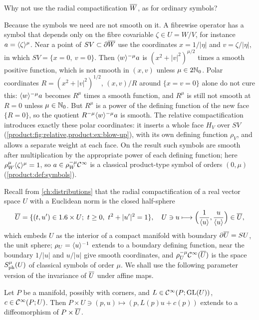 \begin{question}
  Why not use the radial compactification $\overline{W}$, as for ordinary symbols?
\end{question}
\begin{answer}
  Because the symbols we need are not smooth on it. A fibrewise operator has a
  symbol that depends only on the fibre covariable $\zeta\in U=W/V$, for instance
  $a=\langle \zeta\rangle^\mu$. Near a point of $SV\subset\partial\overline{W}$ use the coordinates
  $x=1/|\eta|$ and $v=\zeta/|\eta|$, in which $SV=\{x=0,\ v=0\}$. Then
  $\langle w\rangle^{-\mu}a$ is $(x^2+|v|^2)^{\mu/2}$ times a smooth positive function, which
  is not smooth in $(x,v)$ unless $\mu\in2\mathbb{N}_0$. Polar coordinates
  $R=(x^2+|v|^2)^{1/2}$, $(x,v)/R$ around $\{x=v=0\}$ alone do not cure this:
  $\langle w\rangle^{-\mu}a$ becomes $R^\mu$ times a smooth function, and $R^\mu$ is still not
  smooth at $R=0$ unless $\mu\in\mathbb{N}_0$. But $R^\mu$ is a power of the defining
  function of the new face $\{R=0\}$, so the quotient $R^{-\mu}\langle w\rangle^{-\mu}a$ is
  smooth. The relative compactification introduces exactly these polar
  coordinates: it inserts a whole face $H_V$ over $SV$
  (\cref{product:fig:relative,product:ex:blow-up}), with its own defining function
  $\rho_V$, and allows a separate weight at each face. On the result such symbols
  are smooth after multiplication by the appropriate power of each defining
  function; here $\rho_W^\mu\langle \zeta\rangle^\mu=1$, so $a\in\rho_W^{-\mu}\mathcal{C}^\infty$ is a
  classical product-type symbol of orders $(0,\mu)$
  (\cref{product:def:symbols}).
\end{answer}

Recall from \cref{ch:distributions} that the radial compactification of a real
vector space $U$ with a Euclidean norm is the closed half-sphere
\begin{equation*}
\RC U=\{(t,u')\in\R\times U;\ t\ge0,\ t^2+|u'|^2=1\},\quad
U\ni u\longmapsto\Big(\frac1{\ang u},\frac u{\ang u}\Big)\in\RC U,
\end{equation*}
which embeds $U$ as the interior of a compact manifold with boundary
$\partial\overline{U}=SU$, the unit sphere; $\rho_U=\langle u\rangle^{-1}$ extends to a boundary defining
function, near the boundary $1/|u|$ and $u/|u|$ give smooth coordinates, and
$\rho_U^{-\mu}\mathcal{C}^\infty(\overline{U})$ is the space $S^{\mu}_{\mathrm{ph}}(U)$ of classical symbols of
order $\mu$. We shall use the following parameter version of the invariance of
$\overline{U}$ under affine maps.

\begin{lemma}\label{product:lem:affine}
Let $P$ be a manifold, possibly with corners, and $L\in\mathcal{C}^\infty(P;\operatorname{GL}(U))$,
$c\in\mathcal{C}^\infty(P;U)$. Then $P\times U\ni(p,u)\longmapsto(p,L(p)u+c(p))$ extends to a
diffeomorphism of $P\times\overline{U}$.
\end{lemma}

